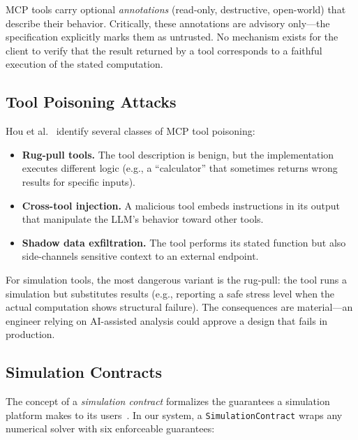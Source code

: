 \documentclass[letterpaper,twocolumn,10pt]{article}
\begin{document}
\noindent MCP tools carry optional \emph{annotations} (read-only, destructive,
open-world) that describe their behavior. Critically, these annotations are
advisory only---the specification explicitly marks them as untrusted. No
mechanism exists for the client to verify that the result returned by a tool
corresponds to a faithful execution of the stated computation.

\subsection{Tool Poisoning Attacks}

Hou et al.~\cite{hou2025mcp} identify several classes of MCP tool poisoning:

\begin{itemize}[nosep,leftmargin=*]
\item \textbf{Rug-pull tools.} The tool description is benign, but the
  implementation executes different logic (e.g., a ``calculator'' that
  sometimes returns wrong results for specific inputs).
\item \textbf{Cross-tool injection.} A malicious tool embeds instructions in
  its output that manipulate the LLM's behavior toward other tools.
\item \textbf{Shadow data exfiltration.} The tool performs its stated function
  but also side-channels sensitive context to an external endpoint.
\end{itemize}

\noindent For simulation tools, the most dangerous variant is the rug-pull:
the tool runs a simulation but substitutes results (e.g., reporting a safe
stress level when the actual computation shows structural failure). The
consequences are material---an engineer relying on AI-assisted analysis could
approve a design that fails in production.

\subsection{Simulation Contracts}

The concept of a \emph{simulation contract} formalizes the guarantees a
simulation platform makes to its users~\cite{trust-by-construction}. In our
system, a \texttt{SimulationContract} wraps any numerical solver with six
enforceable guarantees:
\end{document}
